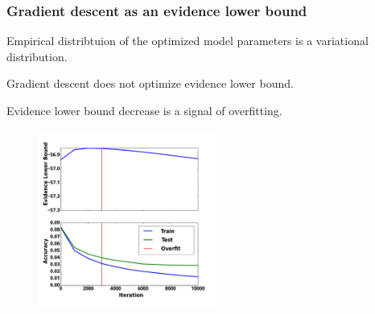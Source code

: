 \documentclass[usenames,dvipsnames,11pt,pdf,utf8,russian,aspectratio=43]{beamer}
\begin{document}
\begin{frame}

\frametitle{Gradient descent as an evidence lower bound}
\footnotesize
Empirical distribtuion of the optimized model parameters is a variational distribution.\\


\begin{multicols}{2}
Gradient descent does not optimize evidence lower bound.
\vspace{-1.cm}
\begin{figure}

\end{figure}

\columnbreak

Evidence lower bound decrease is a signal of overfitting.
\vspace{-1.2cm}
\begin{figure}
{\includegraphics[width=0.52\textwidth]{./slide_plots/sgd_show_en.pdf}}
\end{figure}
\end{multicols}
\end{frame}
\end{document}
